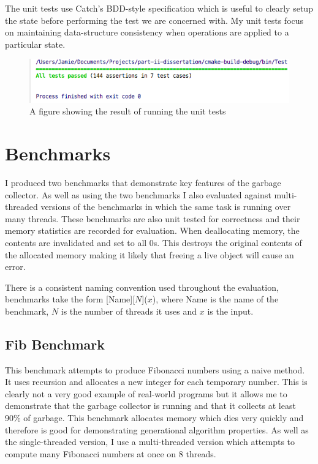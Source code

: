 \documentclass[../diss.tex]{subfiles}
\begin{document}
The unit tests use Catch's BDD-style specification which is useful to clearly setup the state before performing the test we are concerned with. My unit tests focus on maintaining data-structure consistency when operations are applied to a particular state.

\begin{figure}[h]
    \centering
    \includegraphics[max width=\linewidth]{figs/unittests.png}
    \caption{A figure showing the result of running the unit tests}
    \label{fig:unittests}
\end{figure}

\section{Benchmarks} \label{sec:benchmarks}

I produced two benchmarks that demonstrate key features of the garbage collector. As well as using the two benchmarks I also evaluated against multi-threaded versions of the benchmarks in which the same task is running over many threads. These benchmarks are also unit tested for correctness and their memory statistics are recorded for evaluation. When deallocating memory, the contents are invalidated and set to all 0s. This destroys the original contents of the allocated memory making it likely that freeing a live object will cause an error.

There is a consistent naming convention used throughout the evaluation, benchmarks take the form [Name][$N$]($x$), where Name is the name of the benchmark, $N$ is the number of threads it uses and $x$ is the input.

\subsection{Fib Benchmark}

This benchmark attempts to produce Fibonacci numbers using a naive method. It uses recursion and allocates a new integer for each temporary number. This is clearly not a very good example of real-world programs but it allows me to demonstrate that the garbage collector is running and that it collects at least 90\% of garbage. This benchmark allocates memory which dies very quickly and therefore is good for demonstrating generational algorithm properties. As well as the single-threaded version, I use a multi-threaded version which attempts to compute many Fibonacci numbers at once on 8 threads.
\end{document}
